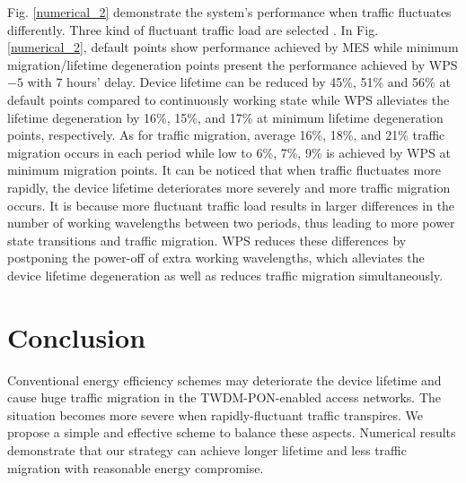 \documentclass[letter]{IEEEtran}
\begin{document}
Fig. \ref{numerical_2} demonstrate the system's performance when traffic fluctuates differently. Three kind of fluctuant traffic load are selected . In Fig. \ref{numerical_2}, default points show performance achieved by MES while minimum migration/lifetime degeneration points present the performance achieved by WPS$ -5 $ with 7 hours' delay. Device lifetime can be reduced by 45\%, 51\% and 56\% at default points compared to continuously working state while WPS alleviates the lifetime degeneration by 16\%, 15\%, and 17\% at minimum lifetime degeneration points, respectively. As for traffic migration, average 16\%, 18\%, and 21\% traffic migration occurs in each period while low to 6\%, 7\%, 9\% is achieved by WPS at minimum migration points. It can be noticed that when traffic fluctuates more rapidly, the device lifetime deteriorates more severely and more traffic migration occurs. It is because more fluctuant traffic load results in larger differences in the number of working wavelengths between two periods, thus leading to more power state transitions and traffic migration. WPS reduces these differences by postponing the power-off of extra working wavelengths, which alleviates the device lifetime degeneration as well as reduces traffic migration simultaneously.
\vspace{-3.0mm}

\section{Conclusion}
Conventional energy efficiency schemes may deteriorate the device lifetime and cause huge traffic migration in the TWDM-PON-enabled access networks. The situation becomes more severe when rapidly-fluctuant traffic transpires. We propose a simple and effective scheme to balance these aspects. Numerical results demonstrate that our strategy can achieve longer lifetime and less traffic migration with reasonable energy compromise.
\vspace{-5.0mm}

\end{document}
